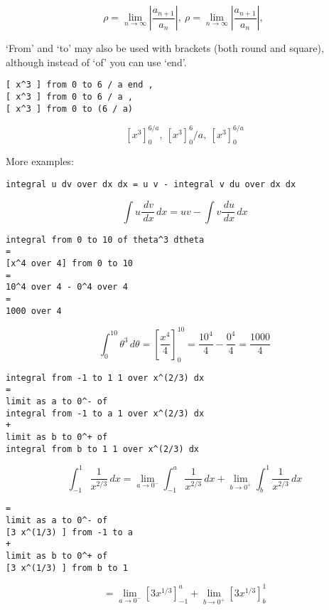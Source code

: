 \documentclass[12pt]{article}
\begin{document}
\[
\rho = \lim _ {n \to \infty} \left| \frac {{a} _ {n + 1}} {{a} _ {n}} \right| , \ \rho = \lim _ {n \to \infty} \left| \frac {{a} _ {n + 1}} {{a} _ {n}} \right| , \ 
\]

\noindent `From' and `to' may also be used with brackets 
(both round and square), although
instead of `of' you can use `end'.

\begin{verbatim}
[ x^3 ] from 0 to 6 / a end ,
[ x^3 ] from 0 to 6 / a ,
[ x^3 ] from 0 to (6 / a)
\end{verbatim}

\[
\left[ {x} ^ {3} \right] _ {0} ^ {6 / a} , \ \left[ {x} ^ {3} \right] _ {0} ^ {6} / a , \ \left[ {x} ^ {3} \right] _ {0} ^ {6 / a}
\]

\noindent More examples:

\begin{verbatim}
integral u dv over dx dx = u v - integral v du over dx dx
\end{verbatim}

\[
\int u \frac {\,d v} {\,d x} \,d x = u v - \int v \frac {\,d u} {\,d x} \,d x
\]

\begin{verbatim}
integral from 0 to 10 of theta^3 dtheta
=
[x^4 over 4] from 0 to 10
=
10^4 over 4 - 0^4 over 4
=
1000 over 4
\end{verbatim}

\[
\int _ {0} ^ {10} {\theta} ^ {3} \,d \theta = \left[ \frac {{x} ^ {4}} {4} \right] _ {0} ^ {10} = \frac {{10} ^ {4}} {4} - \frac {{0} ^ {4}} {4} = \frac {1000} {4}
\]

\begin{verbatim}
integral from -1 to 1 1 over x^(2/3) dx
=
limit as a to 0^- of
integral from -1 to a 1 over x^(2/3) dx
+ 
limit as b to 0^+ of
integral from b to 1 1 over x^(2/3) dx
\end{verbatim}

\[
\int _ { - 1} ^ {1} \frac {1} {{x} ^ {2 / 3}} \,d x = \lim _ {a \to {0} ^ {-}} \int _ { - 1} ^ {a} \frac {1} {{x} ^ {2 / 3}} \,d x + \lim _ {b \to {0} ^ {+}} \int _ {b} ^ {1} \frac {1} {{x} ^ {2 / 3}} \,d x
\]

\begin{verbatim}
= 
limit as a to 0^- of
[3 x^(1/3) ] from -1 to a
+ 
limit as b to 0^+ of
[3 x^(1/3) ] from b to 1
\end{verbatim}

\[
 = \lim _ {a \to {0} ^ {-}} \left[ 3 {x} ^ {1 / 3} \right] _ { - 1} ^ {a} + \lim _ {b \to {0} ^ {+}} \left[ 3 {x} ^ {1 / 3} \right] _ {b} ^ {1}
\]
\end{document}
